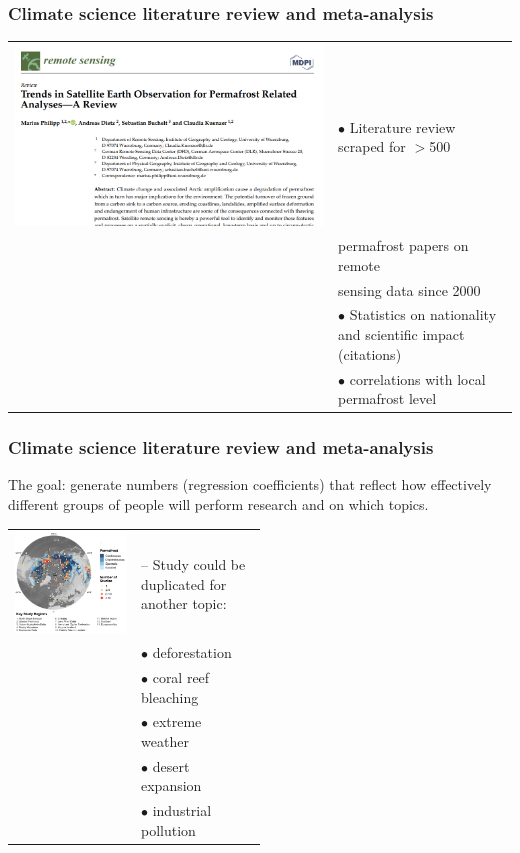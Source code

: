 \documentclass[aspectratio=169,12pt]{beamer}
\begin{document}
	\begin{frame}
		\frametitle{Climate science literature review and meta-analysis}
		
		
		\begin{tabular}{cp{180pt}}
			\includegraphics[width=0.5\linewidth, trim = 0 260pt 0 260pt]{pix/TrendsinSatelliteTitle}& $\bullet$ Literature review scraped for $>$500 \\ &\strut \qquad permafrost papers on remote\\
			& \strut \qquad sensing data since 2000\\
		& $\bullet$ Statistics on nationality and scientific impact (citations)\\
		& $\bullet$ correlations with local permafrost level
		\end{tabular}
	\end{frame}

	\begin{frame}
		\frametitle{Climate science literature review and meta-analysis}
		The goal: generate  numbers (regression coefficients) that reflect how effectively different groups of people will perform research and on which topics.
		\vfill \vfill\vfill
		\begin{tabular}{cp{0.5\linewidth}}
		\includegraphics[width=0.5\linewidth, trim = 0 280pt 0 280pt]{pix/permamap}
		&-- Study could be duplicated for another topic:\\
		&$\bullet$ deforestation\\
		&$\bullet$ coral reef bleaching\\
		&$\bullet$ extreme weather\\
		&$\bullet$ desert expansion\\
		&$\bullet$ industrial pollution\\
	\end{tabular}

	\end{frame}
\end{document}
